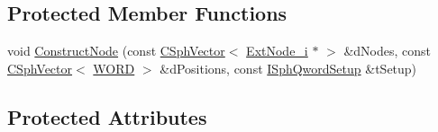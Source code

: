 \subsection*{Protected Member Functions}
\begin{DoxyCompactItemize}
\item 
void \hyperlink{classExtNWayT_ac958aff1f786963e8b8fec79cda6e03e}{Construct\-Node} (const \hyperlink{classCSphVector}{C\-Sph\-Vector}$<$ \hyperlink{classExtNode__i}{Ext\-Node\-\_\-i} $\ast$ $>$ \&d\-Nodes, const \hyperlink{classCSphVector}{C\-Sph\-Vector}$<$ \hyperlink{sphinxstd_8h_a197942eefa7db30960ae396d68339b97}{W\-O\-R\-D} $>$ \&d\-Positions, const \hyperlink{classISphQwordSetup}{I\-Sph\-Qword\-Setup} \&t\-Setup)
\end{DoxyCompactItemize}
\subsection*{Protected Attributes}
